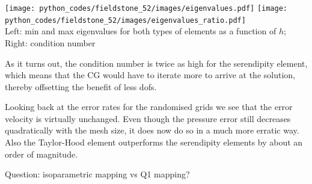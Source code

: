 \begin{center}
\texttt{[image: python\_codes/fieldstone\_52/images/eigenvalues.pdf]}
\texttt{[image: python\_codes/fieldstone\_52/images/eigenvalues\_ratio.pdf]}\\
{\captionfont Left: min and max eigenvalues for both types of elements as a function of $h$; 
Right: condition number}
\end{center}
As it turns out, the condition number is twice as high for the serendipity element, 
which means that the CG would have to iterate more to arrive at the solution, 
thereby offsetting the benefit of less dofs.

Looking back at the error rates for the randomised grids we see that the error 
velocity is virtually unchanged. Even though the pressure error still decreases 
quadratically with the mesh size, it does now do so in a much more erratic way. 
Also the Taylor-Hood element outperforms the serendipity elements by about an 
order of magnitude. 

Question: isoparametric mapping vs Q1 mapping?

